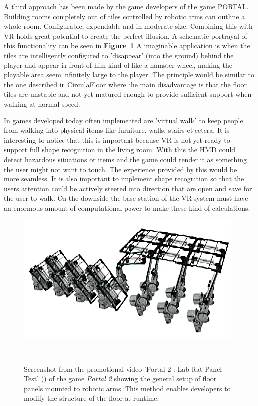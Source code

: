 \begin{description}
	A third approach has been made by the game developers of the game PORTAL. Building rooms completely out of tiles controlled by robotic arms can outline a whole room. Configurable, expendable and in moderate size. Combining this with VR holds great potential to create the perfect illusion. A schematic portrayal of this functionality can be seen in \textbf{Figure~\ref{fig:portallabrattest}}
	A imaginable application is when the tiles are intelligently configured to 'disappear' (into the ground) behind the player and appear in front of him kind of like a hamster wheel, making the playable area seem infinitely large to the player. The principle would be similar to the one described in CirculaFloor where the main disadvantage is that the floor tiles are unstable and not yet matured enough to provide sufficient support when walking at normal speed.
\end{description}

In games developed today often implemented are 'virtual walls' to keep people from walking into physical items like furniture, 
walls, stairs et cetera. It is interesting to notice that this is important because VR is not yet ready to support full shape recognition in the living room. With this the HMD could detect hazardous situations or items and the game could render it as something the user might not want to touch. The experience provided by this would be more seamless.
It is also important to implement shape recognition so that the users attention could be actively steered into direction that are open and save for the user to walk. On the downside the base station of the VR system must have an enormous amount of computational power to make these kind of calculations.

\begin{figure}
	\centering
	\includegraphics[width=0.99\columnwidth]{./figures/portallabrattest}
	\caption[Portal 2 : Lab Rat Panel Test]{Screenshot from the promotional video 'Portal 2 : Lab Rat Panel Test' (\ccbyncsa) of the game \textit{Portal 2 \textregistered\textcopyright} showing the general setup of floor panels mounted to robotic arms. This method enables developers to modify the structure of the floor at runtime.\footnotemark}~\label{fig:portallabrattest}
\end{figure}

